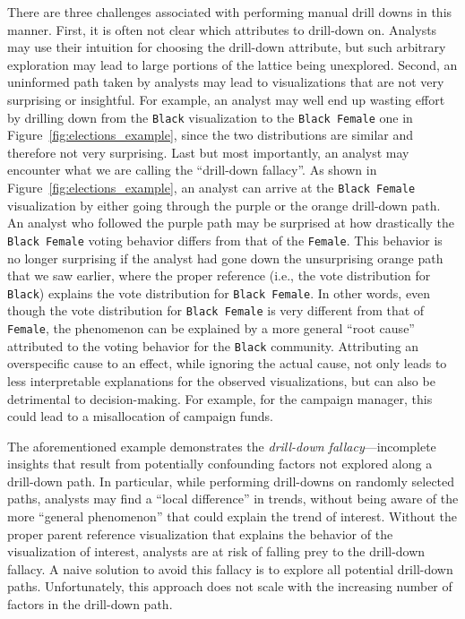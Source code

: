 \par There are three challenges associated with performing manual drill downs in this manner. First, it is often not clear which attributes to drill-down on. Analysts may use their intuition for choosing the drill-down attribute, but such arbitrary exploration may lead to large portions of the lattice being unexplored. Second, an uninformed path taken by analysts may lead to visualizations that are not very surprising or insightful. For example, an analyst may well end up wasting effort by drilling down from the \texttt{Black} visualization to the \texttt{Black Female} one in Figure~\ref{fig:elections_example}, since the two distributions are similar and therefore not very surprising. Last but most importantly, an analyst may encounter what we are calling the ``drill-down fallacy''. As shown in Figure~\ref{fig:elections_example}, an analyst can arrive at the \texttt{Black Female} visualization by either going through the purple or the orange drill-down path. An analyst who followed the purple path may be surprised at how drastically the \texttt{Black Female} voting behavior differs from that of the \texttt{Female}. This behavior is no longer surprising if the analyst had gone down the unsurprising orange path that we saw earlier, where the proper reference (i.e., the vote distribution for \texttt{Black}) explains the vote distribution for \texttt{Black Female}. In other words, even though the vote distribution for \texttt{Black Female} is very different from that of \texttt{Female}, the phenomenon can be explained by a more general ``root cause'' attributed to the voting behavior for the \texttt{Black} community. Attributing an overspecific cause to an effect, while ignoring the actual cause, not only leads to less interpretable explanations for the observed visualizations, but can also be detrimental to decision-making. For example, for the campaign manager, this could lead to a misallocation of campaign funds.
\par The aforementioned example demonstrates the \emph{drill-down fallacy}---incomplete insights that result from potentially confounding factors not explored along a drill-down path. In particular, while performing drill-downs on randomly selected paths, analysts may find a ``local difference'' in trends, without being aware of the more ``general phenomenon'' that could explain the trend of interest. Without the proper parent reference visualization that explains the behavior of the visualization of interest, analysts are at risk of falling prey to the drill-down fallacy. A naive solution to avoid this fallacy is to explore all potential drill-down paths. Unfortunately, this approach does not scale with the increasing number of factors in the drill-down path.
